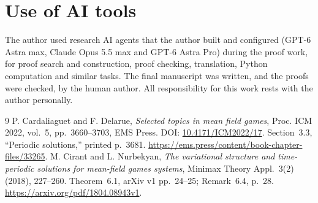 \documentclass[11pt,a4paper]{article}
\begin{document}
\section*{Use of AI tools}
The author used research AI agents that the author built and configured (GPT-6 Astra max,
Claude Opus 5.5 max and GPT-6 Astra Pro) during the proof work, for proof search and
construction, proof checking, translation, Python computation and similar tasks. The final
manuscript was written, and the proofs were checked, by the human author. All responsibility
for this work rests with the author personally.

\begin{thebibliography}{9}
 P. Cardaliaguet and F. Delarue,
\emph{Selected topics in mean field games}, Proc. ICM 2022, vol.~5,
pp.~3660--3703, EMS Press. DOI:
\href{https://doi.org/10.4171/ICM2022/17}{10.4171/ICM2022/17}.
Section~3.3, ``Periodic solutions,'' printed p.~3681.
\url{https://ems.press/content/book-chapter-files/33265}.
 M. Cirant and L. Nurbekyan,
\emph{The variational structure and time-periodic solutions for
mean-field games systems}, Minimax Theory Appl.~3(2) (2018), 227--260.
Theorem~6.1, arXiv v1 pp.~24--25; Remark~6.4, p.~28.
\url{https://arxiv.org/pdf/1804.08943v1}.
\end{thebibliography}
\end{document}
